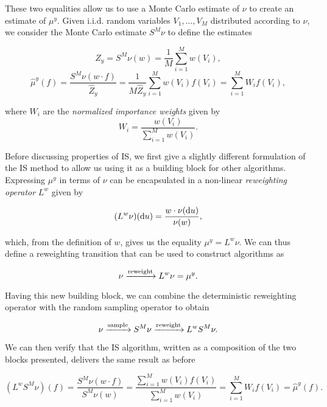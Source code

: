 These two equalities allow us to use a Monte Carlo estimate of $\nu$ to create an estimate of $\mu^y$. Given i.i.d. random variables $V_1, \ldots, V_M$ distributed according to $\nu$, we consider the Monte Carlo estimate $S^M\nu$ to define the estimates

\begin{equation*}
  \hat Z_y = S^M\nu(w) = \frac1M\sum_{i=1}^M{w(V_i)},
\end{equation*}
\begin{equation*}
  \hat\mu^y(f) = \frac{S^M\nu(w \cdot f)}{\hat Z_y} = \frac1{M\hat Z_y}\sum_{i=1}^M{w(V_i)f(V_i)}
               = \sum_{i=1}^MW_if(V_i),
\end{equation*}

where $W_i$ are the \textit{normalized importance weights} given by
\begin{equation*}
  W_i = \frac{w(V_i)}{\sum_{i=1}^M{w(V_i)}}.
\end{equation*}

Before discussing properties of IS, we first give a slightly different formulation of the IS method to allow us using it as a building block for other algorithms. Expressing $\mu^y$ in terms of $\nu$ can be encapsulated in a non-linear \textit{reweighting operator} $L^w$ given by

\begin{equation*}
  (L^w\nu)(\text{d} u) = \frac{w \cdot \nu(\text{d} u)}{\nu(w)},
\end{equation*}

which, from the definition of $w$, gives us the equality $\mu^y = L^w\nu$. We can thus define a reweighting transition that can be used to construct algorithms as

\begin{equation*}
  \nu \xrightarrow{\text{reweight}} L^w\nu = \mu^y.
\end{equation*}

Having this new building block, we can combine the deterministic reweighting operator with the random sampling operator to obtain

\begin{equation*}
  \nu \xrightarrow{\text{sample}} S^M\nu \xrightarrow{\text{reweight}} L^wS^M\nu.
\end{equation*}

We can then verify that the IS algorithm, written as a composition of the two blocks presented, delivers the same result as before

\begin{equation*}
  (L^wS^M\nu)(f)
               = \frac{S^M\nu(w \cdot f)}{S^M\nu(w)}
               = \frac{\sum_{i=1}^Mw(V_i)f(V_i)}{\sum_{i=1}^Mw(V_i)}
               = \sum_{i=1}^MW_if(V_i) = \hat\mu^y(f).
\end{equation*}

